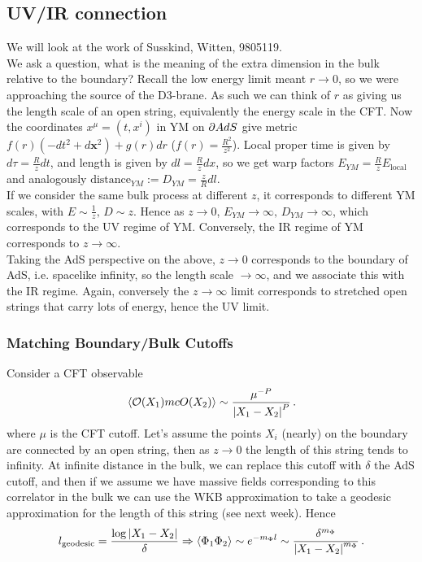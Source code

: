 \documentclass{article}
\begin{document}
\subsection{UV/IR connection}
We will look at the work of Susskind, Witten, 9805119. \\
We ask a question, what is the meaning of the extra dimension in the bulk relative to the boundary? Recall the low energy limit meant $r \to 0$, so we were approaching the source of the D3-brane. As such we can think of $r$ as giving us the length scale of an open string, equivalently the energy scale in the CFT. Now the coordinates $x^\mu = (t, x^i)$ in YM  on $\partial AdS$ give metric $f(r)(-dt^2+d\bm{x}^2)+g(r)dr$ ($f(r) = \frac{R^2}{z^2}$). Local proper time is given by $d\tau = \frac{R}{z}dt$, and length is given by $dl = \frac{R}{z}dx$, so we get warp factors $E_{YM} = \frac{R}{z} E_{\text{local}}$ and analogously $\text{distance}_{YM}:= D_{YM} = \frac{z}{R} dl$. \\
If we consider the same bulk process at different $z$, it corresponds to different YM scales, with $E \sim \frac{1}{z}, \, D \sim z$. Hence as $z \to 0$, $E_{YM} \to \infty, \, D_{YM} \to \infty$, which corresponds to the UV regime of YM. Conversely, the IR regime of YM corresponds to $z \to \infty$. \\
Taking the AdS perspective on the above, $z \to 0$ corresponds to the boundary of AdS, i.e. spacelike infinity, so the length scale $ \to \infty$, and we associate this with the IR regime. Again, conversely the $z \to \infty$ limit corresponds to stretched open strings that carry lots of energy, hence the UV limit. 
\subsubsection{Matching Boundary/Bulk Cutoffs}
Consider a CFT observable 
\[
\left\langle \mathcal{O}(X_1) mc{O}(X_2) \right\rangle \sim \frac{\mu^{-P}}{\left\lvert X_1 - X_2 \right\rvert^P} \, . 
\]
where $\mu$ is the CFT cutoff. Let's assume the points $X_i$ (nearly) on the boundary are connected by an open string, then as $z \to 0$ the length of this string tends to infinity. At infinite distance in the bulk, we can replace this cutoff with $\delta$ the AdS cutoff, and then if we assume we have massive fields corresponding to this correlator in the bulk we can use the WKB approximation to take a geodesic approximation for the length of this string (see next week). Hence
\[
l_{\text{geodesic}} = \frac{\log \left\lvert X_1-X_2 \right\rvert}{\delta} \Rightarrow \left\langle \Phi_1 \Phi_2 \right\rangle \sim e^{-m_\Phi l} \sim \frac{\delta^{m_\Phi}}{\left\lvert X_1-X_2 \right\rvert^{m_\Phi}} \, .
\]
\end{document}
